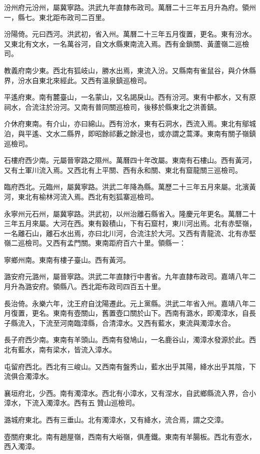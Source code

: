 汾州府元汾州，屬冀寧路。洪武九年直隸布政司。萬曆二十三年五月升為府。領州一，縣七。東北距布政司二百里。

汾陽倚。元曰西河。洪武初，省入州。萬曆二十三年五月復置，更名。東有汾水。又東北有文水，一名萬谷河，自文水縣東南流入焉。西有金鎖關、黃蘆嶺二巡檢司。

教義府南少東。西北有狐岐山，勝水出焉，東流入汾。又縣南有雀鼠谷，與介休縣界，汾水自東北來經此。又西有溫泉鎮巡檢司。

平遙府東。南有麓臺山，一名蒙山，又名謁戾山。西有汾河。東有中都水，又有原祠水，合流注於汾河。又南有普同關巡檢司，後移於縣東北之洪善鎮。

介休府東南。有介山，亦曰綿山。西有汾水，東有石洞水，西流入焉。東北有鄔城泊，與平遙、文水二縣界，即昭餘祁藪之餘浸也，或亦謂之蒿澤。東南有關子嶺鎮巡檢司。

石樓府西少南。元屬晉寧路之隰州。萬曆四十年改屬。東南有石樓山。西有黃河，又有土軍川流入焉。又西北有上平關、西有永和關、東北有窟龍關三巡檢司。

臨府西北。元臨州，屬冀寧路。洪武二年降為縣。萬歷二十三年五月來屬。北濱黃河，東北有榆林河流入焉。西北有剋狐寨巡檢司。

永寧州元石州，屬冀寧路。洪武初，以州治離石縣省入。隆慶元年更名。萬曆二十三年五月來屬。大河在西。東有穀積山，下有石窟村，東川河出焉。北有赤堅嶺，一名離石山，離石水出焉，亦曰北川河，合流注於大河。又西有青龍流、北有赤堅嶺二巡檢司。又西有孟門關。東南距府百六十里。領縣一：

寧鄉州南。東南有樓子臺山。西有黃河。

潞安府元潞州，屬晉寧路。洪武二年直隸行中書省。九年直隸布政司。嘉靖八年二月升為潞安府。領縣八。西北距布政司四百五十里。

長治倚。永樂六年，沈王府自沈陽遷此。元上黨縣。洪武二年省入州。嘉靖八年二月復置，更名。東南有壺關山，舊置壺口關於山下。西南有潞水，即濁漳水，自長子縣流入，下流至河南臨漳縣，合清漳水。又西有藍水，東流與濁漳水合。

長子府西少南。東南有羊頭山。西南有發鳩山，一名鹿谷山，濁漳水發源於此。西北有藍水，南有梁水，皆流入漳水。

屯留府西北。西北有三峻山。又西南有盤秀山，藍水出乎其陽，絳水出乎其陰，下流俱合濁漳水。

襄垣府北，少西。南有濁漳水。西北有小漳水，又有涅水，自武鄉縣流入界，合小漳水，下流入濁漳水。西有五贊山巡檢司。

潞城府東北。西有三垂山。北有濁漳水，又有絳水，流合焉，謂之交漳。

壺關府東北。南有趙屋嶺，西南有大峪嶺，俱產鐵。東南有羊腸板。西北有壺水，西入濁漳。

